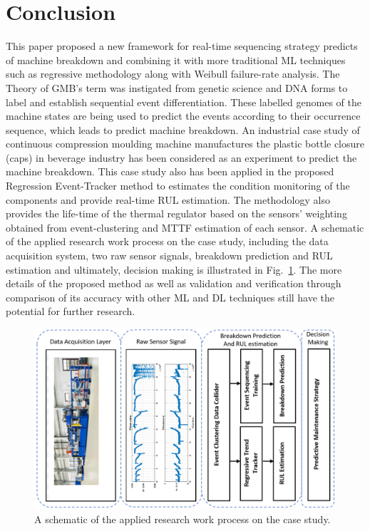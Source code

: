 \documentclass[conference]{IEEEtran}
\begin{document}
\section{Conclusion}
\label{sec:conclusion}
This paper proposed a new framework for real-time sequencing strategy predicts of machine breakdown and combining it with more traditional ML techniques such as regressive methodology along with Weibull failure-rate analysis. The Theory of GMB’s term was instigated from genetic science and DNA forms to label and establish sequential event differentiation. These labelled genomes of the machine states are being used to predict the events according to their occurrence sequence, which leads to predict machine breakdown. An industrial case study of continuous compression moulding machine manufactures the plastic bottle closure (caps) in beverage industry has been considered as an experiment to predict the machine breakdown. This case study also has been applied in the proposed Regression Event-Tracker method to estimates the condition monitoring of the components and provide real-time RUL estimation. The methodology also provides the life-time of the thermal regulator based on the sensors' weighting obtained from event-clustering and MTTF estimation of each sensor. A schematic of the applied research work process on the case study, including the data acquisition system, two raw sensor signals, breakdown prediction and RUL estimation and ultimately, decision making is illustrated in Fig.~\ref{fig:Schematic_applied_work}.  The more details of the proposed method as well as validation and verification through comparison of its accuracy with other ML and DL techniques still have the potential for further research.
\begin{figure}[htbp]
\centerline{\includegraphics[width=\linewidth]{Overall.png}}
\caption{A schematic of the applied research work process on the case study.}
\label{fig:Schematic_applied_work}
\end{figure}



\end{document}

